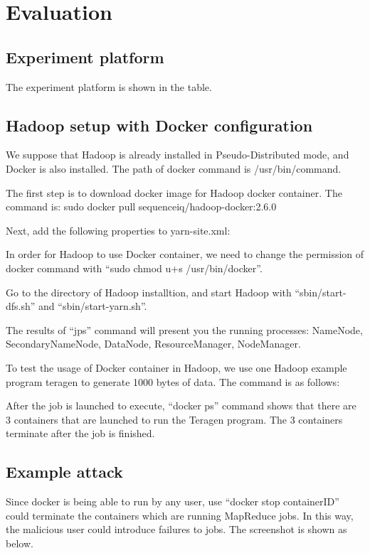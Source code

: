 \section{Evaluation}
\label{sec:eval}

\iffalse
Evaluation (don't forget to interpret your data)
\fi

\subsection{Experiment platform}

The experiment platform is shown in the table.



\subsection{Hadoop setup with Docker configuration}

We suppose that Hadoop is already installed in Pseudo-Distributed mode, and Docker is also installed. The path of docker command is /usr/bin/command.

The first step is to download docker image for Hadoop docker container. The command is: sudo docker pull sequenceiq/hadoop-docker:2.6.0

Next, add the following properties to yarn-site.xml:



In order for Hadoop to use Docker container, we need to change the permission of docker command with “sudo chmod u+s /usr/bin/docker”.

Go to the directory of Hadoop installtion, and start Hadoop with “sbin/start-dfs.sh” and “sbin/start-yarn.sh”. 

The results of  “jps” command will present you the running processes: NameNode, SecondaryNameNode, DataNode, ResourceManager, NodeManager.

To test the usage of Docker container in Hadoop, we use one Hadoop example program teragen to generate 1000 bytes of data. The command is as follows:

\iffalse
bin/hadoop jar share/hadoop/mapreduce/hadoop-mapreduce-examples-2.6.0.jar teragen -Dmapreduce.map.env="yarn.nodemanager.docker-container-executor.image-name=sequenceiq/hadoop-docker:2.6.0" -Dyarn.app.mapreduce.am.env="yarn.nodemanager.docker-container-executor.image-name=sequenceiq/hadoop-docker:2.6.0" 1000 teragen_out_dir
\fi

After the job is launched to execute, “docker ps” command shows that there are 3 containers that are launched to run the Teragen program. The 3 containers terminate after the job is finished.

\subsection{Example attack}

Since docker is being able to run by any user, use “docker stop containerID” could terminate the containers which are running MapReduce jobs. In this way, the malicious user could introduce failures to jobs. The screenshot is shown as below.